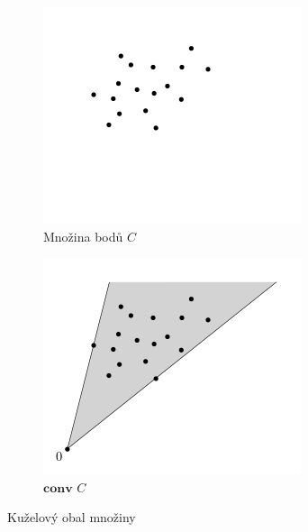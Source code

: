 \begin{figure}[h!]
    \centering
    \begin{subfigure}[b]{0.3\textwidth}
        \centering
        \includegraphics[width=\textwidth]{img/points.png}
        \caption{Množina bodů $C$}
        \label{fig:cone_hull:a}
    \end{subfigure}

    \hfill

    \begin{subfigure}[b]{0.3\textwidth}
        \centering
        \includegraphics[width=\textwidth]{img/cone_hull.png}
        \caption{$\textbf{conv }C$}
        \label{fig:cone_hull:b}
    \end{subfigure}
     
    \caption{Kuželový obal množiny}
    \label{fig:cone_hull}
\end{figure}


